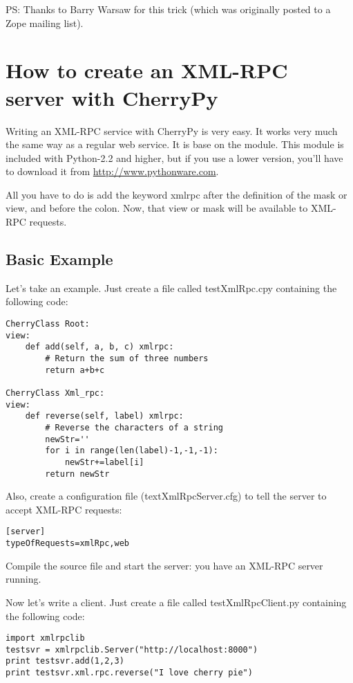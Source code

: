 \documentclass{manual}
\begin{document}
PS: Thanks to Barry Warsaw for this trick (which was originally posted to a Zope mailing list).

\chapter{How to create an XML-RPC server with CherryPy}
Writing an XML-RPC service with CherryPy is very easy. It works very much the same way as a regular web service.
It is base on the  module. This module is included with Python-2.2 and higher, but if you use a lower
version, you'll have to download it from \url{http://www.pythonware.com}.

All you have to do is add the keyword xmlrpc after the definition of the
mask or view, and before the colon. Now, that view or mask will be
available to XML-RPC requests. 

\section{Basic Example}
Let's take an example. Just create a file called testXmlRpc.cpy
containing the following code: 

\begin{verbatim}
CherryClass Root:
view:
    def add(self, a, b, c) xmlrpc:
        # Return the sum of three numbers
        return a+b+c

CherryClass Xml_rpc:
view:
    def reverse(self, label) xmlrpc:
        # Reverse the characters of a string
        newStr=''
        for i in range(len(label)-1,-1,-1):
            newStr+=label[i]
        return newStr
\end{verbatim}

Also, create a configuration file (textXmlRpcServer.cfg) to tell the
server to accept XML-RPC requests: 

\begin{verbatim}
[server]
typeOfRequests=xmlRpc,web
\end{verbatim}

Compile the source file and start the server: you have an XML-RPC server
running. 

Now let's write a client. Just create a file called testXmlRpcClient.py
containing the following code: 

\begin{verbatim}
import xmlrpclib
testsvr = xmlrpclib.Server("http://localhost:8000")
print testsvr.add(1,2,3)
print testsvr.xml.rpc.reverse("I love cherry pie")
\end{verbatim}
\end{document}

